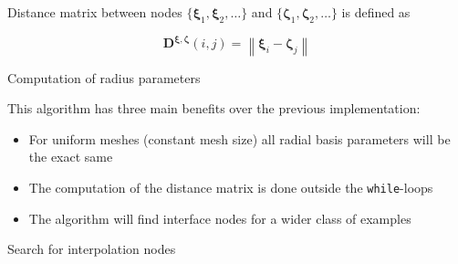\documentclass[11pt, a4paper]{article}
\begin{document}
Distance matrix between nodes $\{\boldsymbol{\xi}_1, \boldsymbol{\xi}_2, \dots\}$
and $\{\boldsymbol{\zeta}_1, \boldsymbol{\zeta}_2, \dots\}$ is defined as

\begin{equation}
    \mathbf{D}^{\boldsymbol{\xi}, \boldsymbol{\zeta}}(i, j) =
        \left\| \boldsymbol{\xi}_i - \boldsymbol{\zeta}_j \right\|
    \label{equ:distance-matrix}
\end{equation}

\begin{algorithm}
    \caption{Computation of radius parameters}
    
    \label{alg:radiusparameters}
\end{algorithm}

This algorithm has three main benefits over the previous implementation:

\begin{itemize}
    \item For uniform meshes (constant mesh size) all radial basis parameters will be the exact same
    \item The computation of the distance matrix is done outside the \texttt{while}-loops
    \item The algorithm will find interface nodes for a wider class of examples
\end{itemize}

\begin{algorithm}
    \caption{Search for interpolation nodes}
    
    \label{alg:nodesearch}
\end{algorithm}
\end{document}
